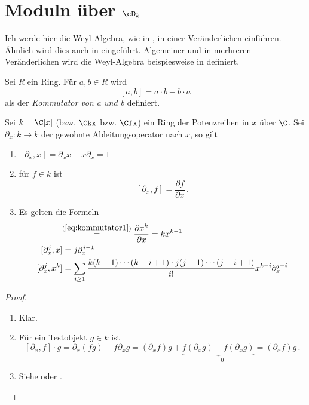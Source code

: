 
\chapter{Moduln über $\cD_k$}
Ich werde hier die Weyl Algebra, wie in \cite[Chapter~1]{sabbah_cimpa90}, in
einer Veränderlichen einführen. Ähnlich wird dies auch in
\cite[Kapittel~2]{ZulaBarbara} eingeführt. Algemeiner und in merhreren
Veränderlichen wird die Weyl-Algebra beispiesweise in
\cite[Chapter~1]{coutinho1995primer} definiert.

\begin{defn}[Kommutator]%
Sei $R$ ein Ring. Für $a,b\in R$ wird
\[[a,b]=a\cdot b-b\cdot a\]
als der \emph{Kommutator von a und b} definiert.
\end{defn}

\begin{prop} \label{prop:d-modul-komutator-regeln}
Sei $k= \C[x]$ (bzw. $\Ckx$ bzw. $\Cfx$) ein Ring der Potenzreihen in $x$ über
$\C$. Sei $\partial_x:k\rightarrow k$ der gewohnte Ableitungsoperator nach $x$,
so gilt 
\begin{enumerate}
\item $[ \partial_x,x] = \partial_xx-x\partial_x=1 $
\item für $f\in k$ ist
\begin{equation} \label{eq:kommutator1}
[\partial_x,f] = \frac{\partial f}{\partial x} \,. 
\end{equation}
\item Es gelten die Formeln
\begin{align}
[\partial_x,x^k] &\!\!\overset{(\ref{eq:kommutator1})}{=}
  \frac{\partial x^k}{\partial x} = kx^{k-1}
  \label{eq:kommutator1b}\\
[\partial_x^j,x]   &= j\partial_x^{j-1}
  \label{eq:kommutator2}\\
[\partial_x^j,x^k] &= \sum_{i\geq1}\frac{k(k-1)\cdots(k-i+1)
  \cdot j(j-1)\cdots(j-i+1)}{i!}x^{k-i}\partial_x^{j-i}
  \label{eq:kommutator3}
\end{align}
\end{enumerate}
\end{prop}
\begin{proof}
\begin{enumerate}
\item Klar.
\item Für ein Testobjekt $g\in k$ ist
\[
[\partial_x,f]\cdot g=\partial_x(fg)-f\partial_xg=
  (\partial_xf)g+\underset{=0}{\underbrace{ 
  f(\partial_xg)-f(\partial_xg)}}=
  (\partial_xf)g \,.
\]
\item Siehe \cite[1.2.4.]{sabbah_cimpa90} oder \cite[Kor 2.8]{ZulaBarbara}.
\end{enumerate}
\end{proof}

